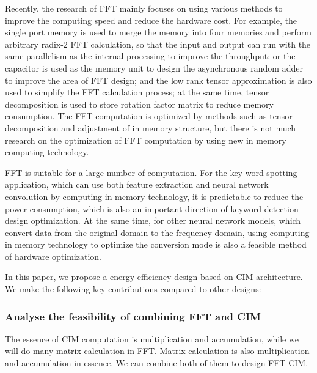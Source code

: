 \documentclass[journal]{IEEEtran}
\begin{document}
Recently, the research of FFT mainly focuses on using various methods to improve the computing speed and reduce the hardware cost. For example, the single port memory is used to merge the memory into four memories and perform arbitrary radix-2 FFT calculation, so that the input and output can run with the same parallelism as the internal processing to improve the throughput; or the capacitor is used as the memory unit to design the asynchronous random adder to improve the area of FFT design; and the low rank tensor approximation is also used to simplify the FFT calculation process; at the same time, tensor decomposition is used to store rotation factor matrix to reduce memory consumption. The FFT computation is optimized by methods such as tensor decomposition and adjustment of in memory structure, but there is not much research on the optimization of FFT computation by using new in memory computing technology.

FFT is suitable for a large number of computation. For the key word spotting application, which can use both feature extraction and neural network convolution by computing in memory technology, it is predictable to reduce the power consumption, which is also an important direction of keyword detection design optimization. At the same time, for other neural network models, which convert data from the original domain to the frequency domain, using computing in memory technology to optimize the conversion mode is also a feasible method of hardware optimization.

In this paper, we propose a energy efficiency design based on CIM architecture. We make the following key contributions compared to other designs:




\subsubsection{Analyse the feasibility of combining FFT and CIM}
The essence of CIM computation is multiplication and accumulation, while
we will do many matrix calculation in FFT. Matrix calculation is also multiplication and accumulation in essence. We can combine both of them to design FFT-CIM.
\end{document}
